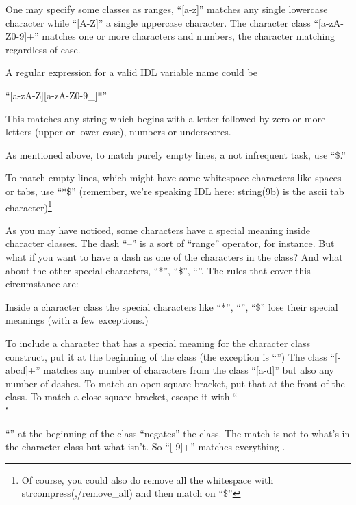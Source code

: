     One may specify some classes as ranges, ``[a-z]'' matches any
  single lowercase character while ``[A-Z]'' a single uppercase
  character. The character class ``[a-zA-Z0-9]+'' matches one or more
  characters and numbers, the character matching regardless of case.

  A regular expression for a valid IDL variable name could be

  ``[a-zA-Z][a-zA-Z0-9\_]*''

   This matches any string which begins with a letter followed by
  zero or more letters (upper or lower case), numbers or underscores.

  As mentioned above, to match purely empty lines, a not infrequent
  task, use ``\caret\$.''

  To match empty lines, which might have some whitespace characters
  like spaces or tabs, use ``\caret [ `` + string(9b) + ``]*\$''
  (remember, we're speaking IDL here: string(9b) is the ascii tab
  character)\footnote{Of course, you could also do remove all the
  whitespace with strcompress(,/remove\_all) and then match on
  ``\caret\$''}


  As you may have noticed, some characters have a special meaning
  inside character classes. The dash ``--'' is a sort of ``range''
  operator, for instance. But what if you want to have a dash as one of
  the characters in the class? And what about the other special
  characters, ``*'', ``\$'', ``\caret''. The rules that cover this
  circumstance are:

\bi

  \item Inside a character class the special characters like ``*'',
  ``\caret'', ``\$'' lose their special meanings (with a few
  exceptions.)

  \item To include a character that has a special meaning for the
  character class construct, put it at the beginning of the class (the
  exception is ``\caret'') The class ``[-abcd]+'' matches any number
  of characters from the class ``[a-d]'' but also any number of
  dashes. To match an open square bracket, put that at the front of
  the class. To match a close square bracket, escape it with ``\\\."

  \item ``\caret'' at the
  beginning of the class ``negates'' the class. The match is not to
  what's in the character class but what isn't. So ``[-9]+''
  matches everything . 


